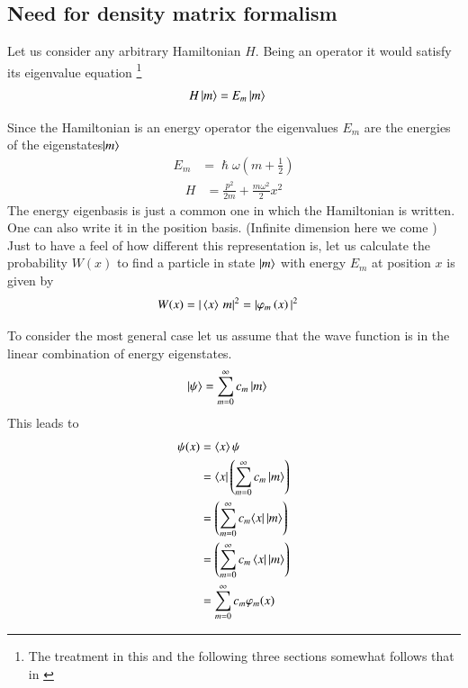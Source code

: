 \subsection{Need for density matrix formalism}
Let us consider any arbitrary Hamiltonian $H$. Being an operator it would satisfy its eigenvalue equation \footnote{The treatment in this and the following three sections somewhat follows that in \citep{traxler2009decoherence}}
\begin{align}\label{eq:17}
H\ket{m}&=E_{m}\ket{m}
\end{align}

Since the Hamiltonian is an energy operator the eigenvalues $E_{m}$  are the energies of the eigenstates\thinspace $\ket{m}$ 
\begin{align}\label{eq:18}
{ E }_{ m }&=\hslash \omega \left( m+\frac { 1 }{ 2 }  \right)
\end{align}
\begin{align}\label{eq:19}
H&=\frac { { p }^{ 2 } }{ 2m } +\frac { m{ \omega  }^{ 2 } }{ 2 } { x }^{ 2 }
\end{align}
The energy eigenbasis is just a common one in which the Hamiltonian is written. One can also write it in the position basis. (Infinite dimension here we come )
Just to have a feel of how different this representation is, let us calculate the probability $W(x)$ to find a particle in state $\ket{m}$ with energy $E_{m}$ at position $x$ is given by
\begin{align}\label{eq:20}
W(x)&=\vert \braket{x}{\thinspace m}\vert^{2}=|{ \varphi  }_{ m }\left( x \right) { | }^{ 2 }
\end{align}

To consider the most general case let us assume that the wave function is in the linear combination of energy eigenstates.  
\begin{align}\label{eq:21}
\ket{\psi}&=\sum _{ m=0 }^{ \infty  }{ { c }_{ m } }\ket{m}
\end{align}
This leads to 
\begin{align}\label{eq:22}
\psi{(x)}&=\braket{x}{\psi}\notag\\
&=\bra{x}\left(\sum _{ m=0 }^{ \infty  }{ { c }_{ m } }\ket{m}\right)\notag\\
&=\left(\sum _{ m=0 }^{ \infty  }{ { c }_{ m } }{\bra{x}}\ket{m}\right)\notag\\
&=\left(\sum _{ m=0 }^{ \infty  }{ { c }_{ m } }\bra{x}\ket{m}\right)\notag\\
&=\sum _{ m=0 }^{ \infty  }{ { c }_{ m } }{\varphi}_{m}{(x)}
 \end{align}

